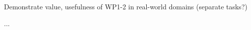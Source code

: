 \begin{task}[
  title=Practical demonstrations,
  id=demos,
  lead=SRL,
  PM=1,
  wphases={0-36},
  partners={XXX}
]
  Demonstrate value, usefulness of WP1-2 in real-world domains (separate tasks?)

  \begin{compactitem}
  \item ...
  \end{compactitem}
\end{task}
